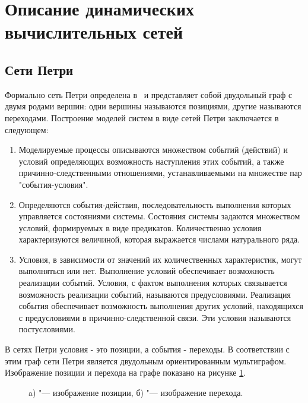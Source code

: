\section{Описание динамических вычислительных сетей}
  \subsection{Сети Петри}
  
	  Формально сеть Петри определена в~\cite{piterson} и представляет собой двудольный граф с двумя родами вершин: одни вершины называются позициями, другие
	  называются переходами. 
	  Построение моделей систем в виде сетей Петри заключается в следующем:
	  \begin{enumerate}
	  	\item 	Моделируемые процессы описываются множеством событий (действий) и условий определяющих возможность наступления этих событий, а также причинно-следственными отношениями, устанавливаемыми на множестве пар "события-условия".
	  	\item Определяются события-действия, последовательность выполнения которых управляется состояниями системы. Состояния системы задаются множеством условий, формируемых в виде предикатов. Количественно условия характеризуются величиной, которая выражается числами натурального ряда.
	  	\item Условия, в зависимости от значений их количественных характеристик, могут выполняться или нет. Выполнение условий обеспечивает возможность реализации событий. Условия, с фактом выполнения которых связывается возможность реализации событий, называются предусловиями. Реализация события обеспечивает возможность выполнения других условий, находящихся с предусловиями в причинно-следственной связи. Эти условия называются постусловиями.
	  \end{enumerate}

	  В сетях Петри условия - это позиции, а события - переходы. В соответствии с этим граф сети Петри является двудольным ориентированным мультиграфом. Изображение позиции и перехода на графе показано на рисунке \ref{img:example}.
	  
	  \begin{figure}[h!]
	  	\begin{minipage}[ht]{0.49\linewidth}
	  	\end{minipage}
	  	\hfill
	  	\begin{minipage}[ht]{0.49\linewidth}
	  	\end{minipage}
	  	\caption{a) "--- изображение позиции, б) "--- изображение перехода. }
	  	\label{img:example}  
	  \end{figure}
	  
